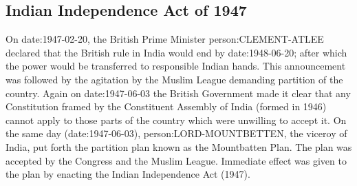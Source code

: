\begin{multicols}{2}
\subsection{Indian Independence Act of 1947}
On \gls{date:1947-02-20}, the British Prime Minister \gls{person:CLEMENT-ATLEE} declared that the British rule in India would end by \gls{date:1948-06-20}; after which the power would be transferred to responsible Indian hands. This announcement was followed by the agitation by the Muslim League demanding partition of the country. Again on \gls{date:1947-06-03} the British Government made it clear that any Constitution framed by the Constituent Assembly of India (formed in 1946) cannot apply to those parts of the country which were unwilling to accept it. On the same day (\gls{date:1947-06-03}), \gls{person:LORD-MOUNTBETTEN}, the viceroy of India, put forth the partition plan known as the Mountbatten Plan. The plan was accepted by the Congress and the Muslim League. Immediate effect was given to the plan by enacting the Indian Independence Act (1947).


\end{multicols}
